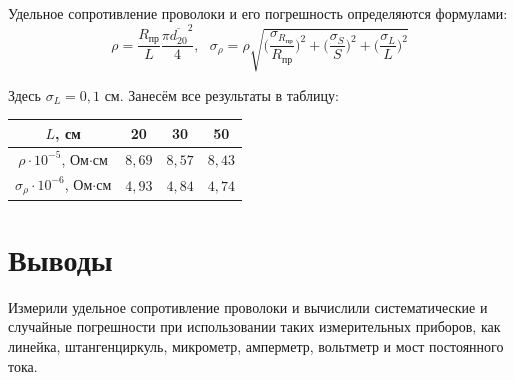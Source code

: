\documentclass[a4paper, 12pt]{article} %
\begin{document}
Удельное сопротивление проволоки и его погрешность определяются формулами:
\[\rho = \frac{R_{\text{пр}}}{L} \frac{\pi \overline{d_{20}}^2}{4}, \text{ } \sigma_{\rho} = \rho \sqrt{\Big( \frac{\sigma_{R_{\text{пр}}}}{R_{\text{пр}}}\Big) ^2 + \Big(\frac{\sigma_S}{S} \Big)^2 + \Big(\frac{\sigma_L}{L} \Big)^2}\]

Здесь $\sigma_{L} = 0,1$ см.
Занесём все результаты в таблицу:
\begin{center}
\begin{tabular}{|c|c|c|c|}
\hline 
$L$, см & 20 & 30 & 50 \\ 
\hline 
$\rho \cdot 10^{-5}$, Ом$\cdot$см & $8,69$ & $8,57$ & $8,43$ \\ 
\hline 
$\sigma_{\rho}\cdot 10^{-6}$, Ом$\cdot$см & $4,93$ & $4,84$ & $4,74$ \\ 
\hline 
\end{tabular} 
\end{center}

\section{Выводы}

Измерили удельное сопротивление проволоки и вычислили систематические и случайные погрешности при использовании таких измерительных приборов, как линейка, штангенциркуль, микрометр, амперметр, вольтметр и мост постоянного тока.
\end{document}
